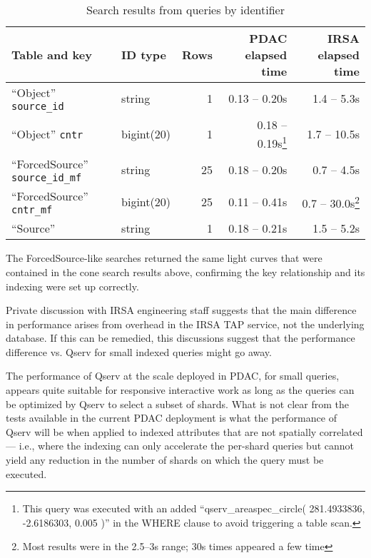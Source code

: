 \begin{table}[h]
\centering
\begin{tabular}{l l r r r}
Table and key & ID type & Rows & PDAC elapsed time & IRSA elapsed time \\ \hline
``Object'' \verb|source_id| & string & 1 & 0.13 -- 0.20s & 1.4 -- 5.3s \\
``Object'' \verb|cntr| & bigint(20) & 1 & 0.18 -- 0.19s\footnote{This query was executed with an added ``qserv\_areaspec\_circle( 281.4933836, -2.6186303, 0.005 )'' in the WHERE clause to avoid triggering a table scan.} & 1.7 -- 10.5s \\  %
``ForcedSource'' \verb|source_id_mf| & string & 25 & 0.18 -- 0.20s & 0.7 -- 4.5s \\
``ForcedSource'' \verb|cntr_mf| & bigint(20) & 25 & 0.11 -- 0.41s\footnotemark[4] & 0.7 -- 30.0s\footnote{Most results were in the 2.5--3s range; 30s times appeared a few time } \\
``Source'' & string & 1 & 0.18 -- 0.21s & 1.5 -- 5.2s \\
\end{tabular}
\caption{Search results from queries by identifier}
\label{tab:idresults}
\end{table}

The ForcedSource-like searches returned the same light curves that were contained in the cone search results above, confirming the key relationship and its indexing were set up correctly.

Private discussion with IRSA engineering staff suggests that the main difference in performance arises from overhead in the IRSA TAP service, not the underlying database.
If this can be remedied, this discussions suggest that the performance difference vs. Qserv for small indexed queries might go away.

The performance of Qserv at the scale deployed in PDAC, for small queries,
appears quite suitable for responsive interactive work as long as the queries can be optimized by Qserv to select a subset of shards.
What is not clear from the tests available in the current PDAC deployment is what the performance of Qserv will be when applied to indexed attributes that are not spatially correlated ---
i.e., where the indexing can only accelerate the per-shard queries but cannot yield any reduction in the number of shards on which the query must be executed.
